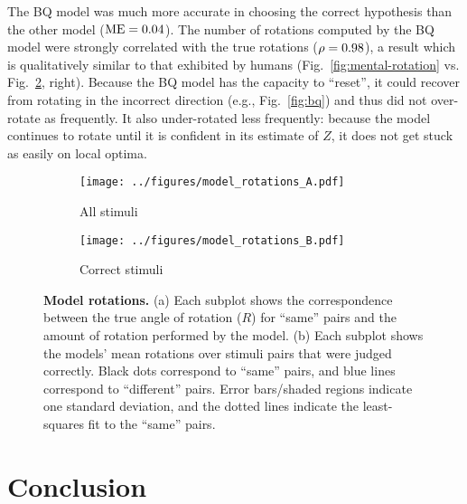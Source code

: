 \documentclass{article} %
\begin{document}
The BQ model was much more accurate in choosing the correct hypothesis
than the other model ($\mathrm{ME}{}=0.04{}$). The number of rotations computed by
the BQ model were strongly correlated with the true rotations
($\rho=0.98$), a result which is qualitatively similar to that exhibited
by humans (Fig.~\ref{fig:mental-rotation}
vs. Fig.~\ref{fig:correct-stimuli}, right). Because the BQ model has
the capacity to ``reset'', it could recover from rotating in the
incorrect direction (e.g., Fig.~\ref{fig:bq}) and thus did not
over-rotate as frequently.  It also under-rotated less frequently:
because the model continues to rotate until it is confident in its
estimate of $Z$, it does not get stuck as easily on local optima.

\begin{figure}[t]
  \centering
  \begin{subfigure}[b]{0.49\textwidth}
    \centering
    \texttt{[image: ../figures/model\_rotations\_A.pdf]}
    \caption{All stimuli}
    \label{fig:all-stimuli}
  \end{subfigure}
  \begin{subfigure}[b]{0.49\textwidth}
    \centering
    \texttt{[image: ../figures/model\_rotations\_B.pdf]}
    \caption{Correct stimuli}
    \label{fig:correct-stimuli}
  \end{subfigure}
  \caption{\textbf{Model rotations.} (a) Each subplot shows the
    correspondence between the true angle of rotation ($R$) for
    ``same'' pairs and the amount of rotation performed by the
    model. (b) Each subplot shows the models' mean rotations over
    stimuli pairs that were judged correctly. Black dots correspond to
    ``same'' pairs, and blue lines correspond to ``different''
    pairs. Error bars/shaded regions indicate one standard deviation,
    and the dotted lines indicate the least-squares fit to the
    ``same'' pairs.}
  \label{fig:rotations}
\end{figure}


\section{Conclusion}
\end{document}

